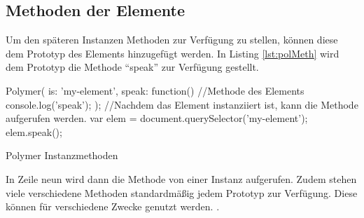 \documentclass[12pt, paper=a4, bibtotoc, toc=listof, headsepline=true]{scrreprt}
\begin{document}
\subsection{Methoden der Elemente}
Um den späteren Instanzen Methoden zur Verfügung zu stellen, können diese dem Prototyp des Elements hinzugefügt werden. In Listing \ref{lst:polMeth} wird dem Prototyp die Methode \enquote{speak} zur Verfügung gestellt.
\begin{listing}
	\begin{JavaScriptcode*}{}
Polymer({
   is: 'my-element',
   speak: function(){  //Methode des Elements
   console.log('speak');
   }
});
//Nachdem das Element instanziiert ist, kann die Methode aufgerufen werden.
var elem = document.querySelector('my-element');
elem.speak();
	\end{JavaScriptcode*}
	\caption{Polymer Instanzmethoden}
	\label{lst:polMeth}
\end{listing} In Zeile neun wird dann die Methode von einer Instanz aufgerufen. Zudem stehen viele verschiedene Methoden standardmäßig jedem Prototyp zur Verfügung. Diese können für verschiedene Zwecke genutzt werden. \cite{polyInstMeth}.
\end{document}
